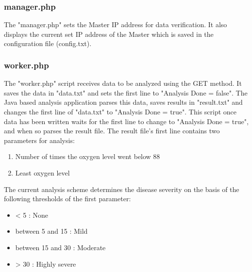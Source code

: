 \documentclass{article}
\begin{document}
\subsubsection{manager.php}
The "manager.php" sets the Master IP address for data verification. It also displays the current set IP address of the Master which is saved in the configuration file (config.txt).

\subsubsection{worker.php}
The "worker.php" script receives data to be analyzed using the GET method. It saves the data in "data.txt" and sets the first line to "Analysis Done = false". The Java based analysis application parses this data, saves results in "result.txt" and changes the first line of "data.txt" to "Analysis Done = true". This script once data has been written waits for the first line to change to "Analysis Done = true", and when so parses the result file. The result file's first line contains two parameters for analysis:
\begin{enumerate}
\item Number of times the oxygen level went below 88
\item Least oxygen level
\end{enumerate}
The current analysis scheme determines the disease severity on the basis of the following thresholds of the first parameter:
\begin{itemize}
\item < 5 : None
\item between 5 and 15 : Mild
\item between 15 and 30 : Moderate
\item > 30 : Highly severe
\end{itemize}
\end{document}
